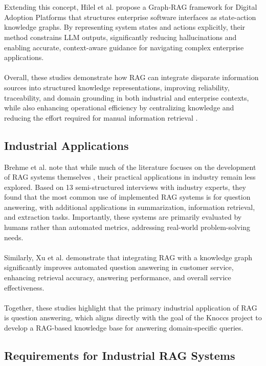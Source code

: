 \\\\
Extending this concept, Hilel et al. \cite{hilel2025graphRAG} propose a Graph-RAG framework for Digital Adoption Platforms that structures enterprise software interfaces as state-action knowledge graphs. By representing system states and actions explicitly, their method constrains LLM outputs, significantly reducing hallucinations and enabling accurate, context-aware guidance for navigating complex enterprise applications.
\\\\
Overall, these studies demonstrate how RAG can integrate disparate information sources into structured knowledge representations, improving reliability, traceability, and domain grounding in both industrial and enterprise contexts, while also enhancing operational efficiency by centralizing knowledge and reducing the effort required for manual information retrieval \cite{Brehme}.

\subsection{Industrial Applications}
Brehme et al. \cite{Brehme} note that while much of the literature focuses on the development of RAG systems themselves \cite{Gao}, their practical applications in industry remain less explored. Based on 13 semi-structured interviews with industry experts, they found that the most common use of implemented RAG systems is for question answering, with additional applications in summarization, information retrieval, and extraction tasks. Importantly, these systems are primarily evaluated by humans rather than automated metrics, addressing real-world problem-solving needs.  
\\\\
Similarly, Xu et al. \cite{Xu} demonstrate that integrating RAG with a knowledge graph significantly improves automated question answering in customer service, enhancing retrieval accuracy, answering performance, and overall service effectiveness.  
\\\\
Together, these studies highlight that the primary industrial application of RAG is question answering, which aligns directly with the goal of the Knoccs project to develop a RAG-based knowledge base for answering domain-specific queries.

\subsection{Requirements for Industrial RAG Systems}

